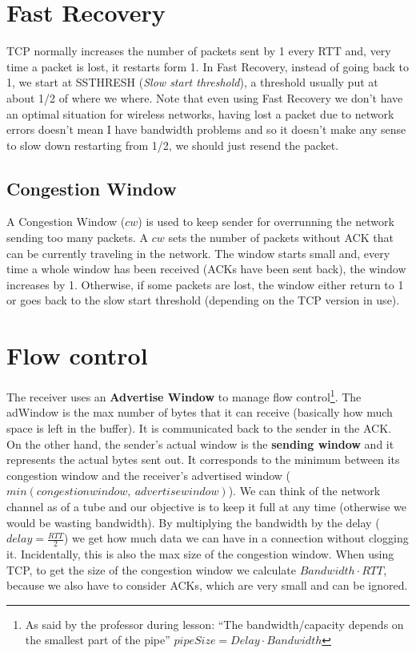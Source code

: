 \section{Fast Recovery}

TCP normally increases the number of 
packets sent by 1 every RTT and, very time a packet is lost, it restarts form 1.
In Fast Recovery, instead of going back to 1, we start at SSTHRESH
(\textit{Slow start threshold}), a threshold usually put at about 1/2 of where
we where. Note that even using Fast Recovery we don't have an optimal situation
for wireless networks, having lost a packet due to network errors doesn't mean I
have bandwidth problems and so it doesn't make any sense to slow down restarting
from 1/2, we should just resend the packet.

\subsection{Congestion Window}
A Congestion Window ($cw$) is used to keep sender for overrunning the network
sending too many packets. A $cw$ sets the number of packets without ACK that can
be currently traveling in the network. The window starts small and, every time
a whole window has been received (ACKs have been sent back), the window
increases by 1. Otherwise, if some packets are lost, the window either return to
1 or goes back to the slow start threshold (depending on the TCP version in
use).

\section{Flow control}

The receiver uses an \textbf{Advertise Window} to manage flow control\footnote{
  As said by the professor during lesson: ``The bandwidth/capacity depends on
  the smallest part of the pipe'' $pipeSize = Delay \cdot Bandwidth$
}. The adWindow is the max number of bytes that it can receive (basically how
much space is left in the buffer). It is communicated back to the sender in the
ACK. 
On the other hand, the sender's actual window is the \textbf{sending window}
and 
it represents the actual bytes sent out. It corresponds to the minimum between 
its congestion window and the receiver's advertised window
($min(congestion window,\ advertise window)$). 
We can think of the network channel as of a tube and our objective is to 
keep it full at any time (otherwise we would be wasting bandwidth). By
multiplying the 
bandwidth by the delay ($delay = \frac{RTT}{2}$) we get how much data we can
have in a connection without clogging it. Incidentally, this is also the max
size of the congestion window. When using TCP, to get the size of the congestion
window we calculate $Bandwidth \cdot RTT$, because we also have to consider
ACKs, which are very small and can be 
ignored.

